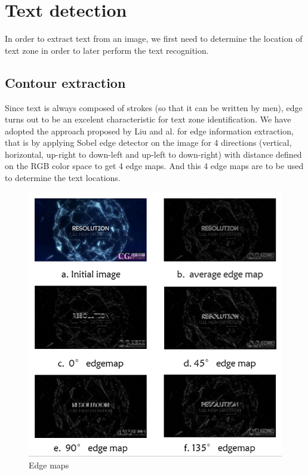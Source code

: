 \documentclass[paper=a4, french, 11pt]{scrartcl}
\begin{document}
\section{Text detection} \mbox{} \vspace{-0.5cm}

In order to extract text from an image, we first need to determine the location of text zone in order to later perform the text recognition.  

\subsection{Contour extraction} \mbox{} \vspace{-0.5cm}

Since text is always composed of strokes (so that it can be written by men), edge turns out to be an excelent characteristic for text zone identification. We have adopted the approach proposed by Liu and al. for edge information extraction, that is by applying Sobel edge detector on the image for 4 directions (vertical, horizontal, up-right to down-left and up-left to down-right) with distance defined on the RGB color space to get 4 edge maps. And this 4 edge maps are to be used to determine the text locations.

\begin{figure}[h]
\begin{center}
	\vspace{-1ex}
   \includegraphics[width=0.75\linewidth]{edge_filter_example.png}
\end{center}
\vspace{-4ex}
\caption{Edge maps}
\label{fig:heatmap}
\end{figure}
\end{document}
